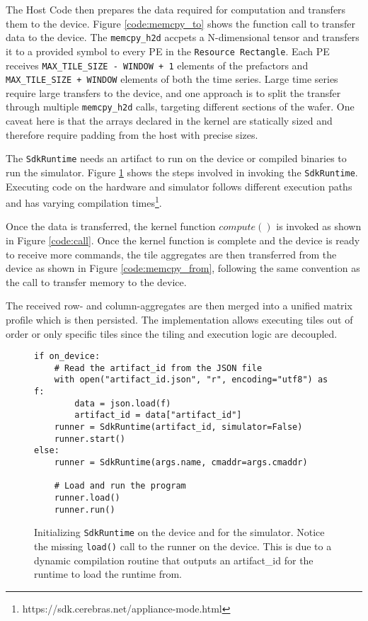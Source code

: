 The Host Code then prepares the data required for computation and transfers them to the device. Figure \ref{code:memcpy_to} shows the function call to transfer data to the device. The \texttt{memcpy\_h2d} accpets a N-dimensional tensor and transfers it to a provided symbol to every PE in the \texttt{Resource Rectangle}. Each PE receives \texttt{MAX\_TILE\_SIZE - WINDOW + 1} elements of the prefactors and \texttt{MAX\_TILE\_SIZE + WINDOW} elements of both the time series. Large time series require large transfers to the device, and one approach is to split the transfer through multiple \texttt{memcpy\_h2d} calls, targeting different sections of the wafer. One caveat here is that the arrays declared in the kernel are statically sized and therefore require padding from the host with precise sizes.

The \texttt{SdkRuntime} needs an artifact to run on the device or compiled binaries to run the simulator. Figure \ref{code:initialize_runner} shows the steps involved in invoking the \texttt{SdkRuntime}. Executing code on the hardware and simulator follows different execution paths and has varying compilation times\footnote{https://sdk.cerebras.net/appliance-mode.html}.

Once the data is transferred, the kernel function $compute()$ is invoked as shown in Figure \ref{code:call}. Once the kernel function is complete and the device is ready to receive more commands, the tile aggregates are then transferred from the device as shown in Figure \ref{code:memcpy_from}, following the same convention as the call to transfer memory to the device.

The received row- and column-aggregates are then merged into a unified matrix profile which is then persisted. The implementation allows executing tiles out of order or only specific tiles since the tiling and execution logic are decoupled.

\begin{figure}[!ht]
    \centering
    \begin{verbatim}
if on_device:
    # Read the artifact_id from the JSON file
    with open("artifact_id.json", "r", encoding="utf8") as f:
        data = json.load(f)
        artifact_id = data["artifact_id"]
    runner = SdkRuntime(artifact_id, simulator=False)
    runner.start()
else:
    runner = SdkRuntime(args.name, cmaddr=args.cmaddr)

    # Load and run the program
    runner.load()
    runner.run()
\end{verbatim}
\caption{Initializing \texttt{SdkRuntime} on the device and for the simulator. Notice the missing \texttt{load()} call to the runner on the device. This is due to a dynamic compilation routine that outputs an artifact\_id for the runtime to load the runtime from.}
\label{code:initialize_runner}
\end{figure}

